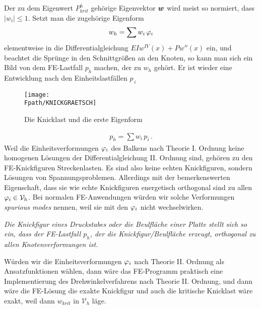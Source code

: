 Der zu dem Eigenwert $P_{krit}^h$ geh\"{o}rige Eigenvektor $\mbox{\boldmath $w$}$ wird meist so normiert, dass $ |w_i|
\leq 1$. Setzt man die zugeh\"{o}rige Eigenform
\begin{align}\label{knick5}
w_h=\sum w_i\,\varphi_i
\end{align}
elementweise in die Differentialgleichung $EI w^{IV}(x) + P w''(x)$ ein, und beachtet
die Spr\"{u}nge in den Schnittgr\"{o}{\ss}en an den Knoten, so kann man sich ein Bild von dem
FE-Lastfall $p_h$ machen, der zu $w_h$ geh\"{o}rt. Er ist wieder eine Entwicklung nach den
Einheitslastf\"{a}llen $p_{\,i}$
\begin{figure}[tbp] \centering
\if {} \sidecaption \fi
\texttt{[image: \\Fpath/KNICKGRAETSCH]}
\caption{{\small Die Knicklast und die erste Eigenform}}\label{KnickGraetsch}
\end{figure}%
\begin{align}
p_h=\sum w_i\,p_i\,.
\end{align}
Weil die Einheitsverformungen $\varphi_i$ des Balkens nach Theorie I. Ordnung keine
homogenen L\"{o}sungen der Differentialgleichung II. Ordnung sind,
geh\"{o}ren zu den FE-Knickfiguren Streckenlasten. Es sind also keine echten Knickfiguren,
sondern L\"{o}sungen von Spannungsproblemen. Allerdings mit der bemerkenswerten
Eigenschaft, dass sie wie echte Knickfiguren energetisch orthogonal sind zu allen
$\varphi_i \in \mathcal{V}_h$. Bei normalen FE-Anwendungen w\"{u}rden wir solche Verformungen {\em
spurious modes\/} nennen, weil sie mit den $\varphi_i$ nicht wechselwirken.

{\em Die Knickfigur eines Druckstabes oder die Beulfl\"{a}che einer Platte stellt sich so ein, dass der FE-Lastfall $p_h$, der die Knickfigur/Beulfl\"{a}che erzeugt, orthogonal zu allen Knotenverformungen ist.}

W\"{u}rden wir die Einheitsverformungen $\varphi_i$ nach Theorie II. Ordnung als Ansatzfunktionen
w\"{a}hlen, dann w\"{a}re das FE-Programm praktisch eine Implementierung des Drehwinkelverfahrens
nach Theorie II. Ordnung, und dann w\"{a}re die FE-L\"{o}sung die exakte Knickfigur und auch die
kritische Knicklast w\"{a}re exakt, weil dann $w_{krit}$ in $\mathcal{V}_h$ l\"{a}ge.\\

